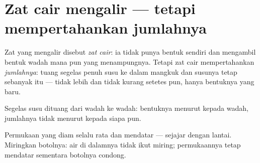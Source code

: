 \section{Zat cair mengalir --- tetapi mempertahankan jumlahnya}

\begin{definition}\label{def:g3:solids-liquids-gases:liquid}
Zat yang mengalir disebut \emph{zat cair}: ia tidak
punya bentuk sendiri dan mengambil bentuk wadah mana pun yang
menampungnya. Tetapi zat cair mempertahankan \emph{jumlahnya}: tuang
segelas penuh susu ke dalam mangkuk dan susunya tetap sebanyak itu ---
tidak lebih dan tidak kurang setetes pun, hanya bentuknya yang baru.
\end{definition}

\begin{omfigure}

{\small Segelas susu dituang dari wadah ke wadah: bentuknya menurut
kepada wadah, jumlahnya tidak menurut kepada siapa pun.}
\end{omfigure}

\begin{proposition}\label{prop:g3:solids-liquids-gases:level}
Permukaan  yang diam selalu rata dan mendatar --- sejajar
dengan lantai. Miringkan botolnya: air di dalamnya tidak ikut miring;
permukaannya tetap mendatar sementara botolnya condong.
\end{proposition}


